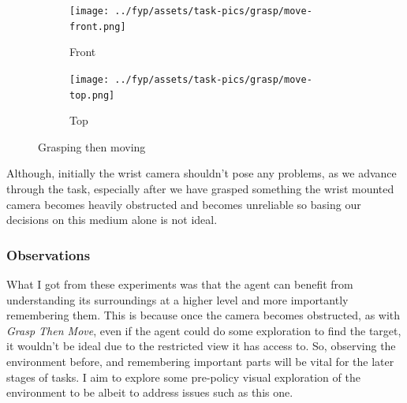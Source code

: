 \begin{figure}[htpb] %
  \centering
  \begin{subfigure}{0.45\linewidth}
    \centering
    \texttt{[image: ../fyp/assets/task-pics/grasp/move-front.png]} 
    \caption{Front}\label{subfig:grasp-move-front}
  \end{subfigure}
  \hfill
  \begin{subfigure}{0.45\linewidth}
    \centering
    \texttt{[image: ../fyp/assets/task-pics/grasp/move-top.png]}
    \caption{Top}\label{subfig:grasp-move-top}
  \end{subfigure}
  \caption{Grasping then moving}\label{fig:grasp-move}
\end{figure}


Although, initially the wrist camera shouldn't pose any problems, as we advance through the task, especially after we have grasped something the wrist mounted camera becomes heavily obstructed and becomes unreliable so basing our decisions on this medium alone is not ideal.

\subsubsection{Observations}
What I got from these experiments was that the agent can benefit from understanding its surroundings at a higher level and more importantly remembering them. This is because once the camera becomes obstructed, as with \emph{Grasp Then Move}, even if the agent could do some exploration to find the target, it wouldn't be ideal due to the restricted view it has access to. So, observing the environment before, and remembering important parts will be vital for the later stages of tasks. I aim to explore some pre-policy visual exploration of the environment to be albeit to address issues such as this one.

\section{}